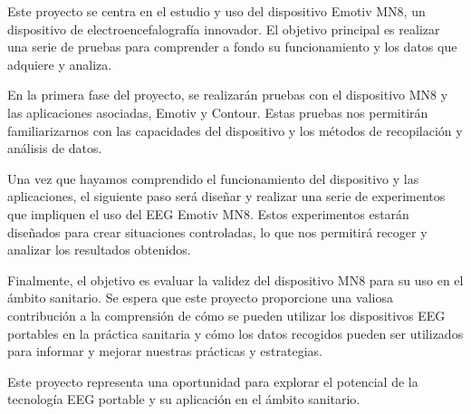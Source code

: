 
Este proyecto se centra en el estudio y uso del dispositivo Emotiv MN8, un dispositivo de electroencefalografía innovador. El objetivo principal es realizar una serie de pruebas para comprender a fondo su funcionamiento y los datos que adquiere y analiza.

En la primera fase del proyecto, se realizarán pruebas con el dispositivo MN8 y las aplicaciones asociadas, Emotiv y Contour. Estas pruebas nos permitirán familiarizarnos con las capacidades del dispositivo y los métodos de recopilación y análisis de datos.

Una vez que hayamos comprendido el funcionamiento del dispositivo y las aplicaciones, el siguiente paso será diseñar y realizar una serie de experimentos que impliquen el uso del EEG Emotiv MN8. Estos experimentos estarán diseñados para crear situaciones controladas, lo que nos permitirá recoger y analizar los resultados obtenidos.

Finalmente, el objetivo es evaluar la validez del dispositivo MN8 para su uso en el ámbito sanitario. Se espera que este proyecto proporcione una valiosa contribución a la comprensión de cómo se pueden utilizar los dispositivos EEG portables en la práctica sanitaria y cómo los datos recogidos pueden ser utilizados para informar y mejorar nuestras prácticas y estrategias.

Este proyecto representa una oportunidad para explorar el potencial de la tecnología EEG portable y su aplicación en el ámbito sanitario.
